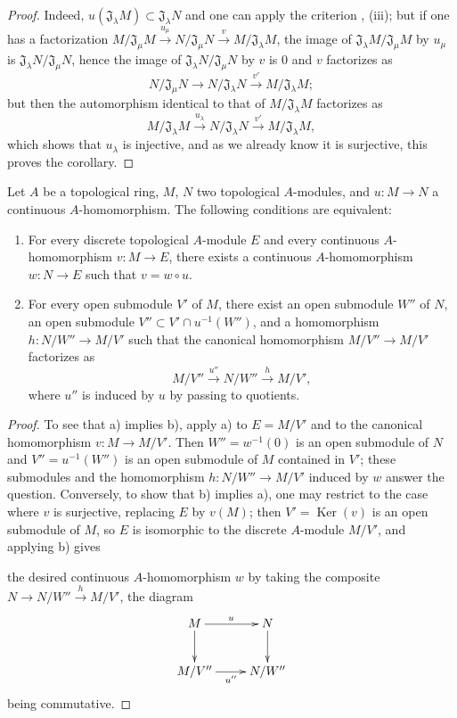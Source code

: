 \begin{proof}
Indeed, $u(\mathfrak{J}_\lambda M)\subset\mathfrak{J}_\lambda N$ and one can apply the criterion , (iii);
but if one has a factorization $M/\mathfrak{J}_\mu M\xrightarrow{u_\mu}N/\mathfrak{J}_\mu N\xrightarrow{v}M/\mathfrak{J}_\lambda M$, the image of $\mathfrak{J}_\lambda M/\mathfrak{J}_\mu M$ by $u_\mu$ is $\mathfrak{J}_\lambda N/\mathfrak{J}_\mu N$, hence the image of $\mathfrak{J}_\lambda N/\mathfrak{J}_\mu N$ by $v$ is $0$ and $v$ factorizes as
\[
  N/\mathfrak{J}_\mu N\to N/\mathfrak{J}_\lambda N\xrightarrow{v'}M/\mathfrak{J}_\lambda M;
\]
but then the automorphism identical to that of $M/\mathfrak{J}_\lambda M$ factorizes as
\[
  M/\mathfrak{J}_\lambda M\xrightarrow{u_\lambda}N/\mathfrak{J}_\lambda N\xrightarrow{v'}M/\mathfrak{J}_\lambda M,
\]
which shows that $u_\lambda$ is injective, and as we already know it is surjective, this proves the corollary.
\end{proof}

\begin{proposition}[19.1.5]
\label{0.19.1.5}
Let $A$ be a topological ring, $M$, $N$ two topological $A$-modules, and $u:M\to N$ a continuous $A$-homomorphism.
The following conditions are equivalent:
\begin{enumerate}
  \item[a)] For every discrete topological $A$-module $E$ and every continuous $A$-homomorphism $v:M\to E$, there exists a continuous $A$-homomorphism $w:N\to E$ such that $v=w\circ u$.
  \item[b)] For every open submodule $V'$ of $M$, there exist an open submodule $W''$ of $N$, an open submodule $V''\subset V'\cap u^{-1}(W'')$, and a homomorphism $h:N/W''\to M/V'$ such that the canonical homomorphism $M/V''\to M/V'$ factorizes as
  \[
    M/V''\xrightarrow{u''}N/W''\xrightarrow{h}M/V',
  \]
  where $u''$ is induced by $u$ by passing to quotients.
\end{enumerate}
\end{proposition}

\begin{proof}
To see that a) implies b), apply a) to $E=M/V'$ and to the canonical homomorphism $v:M\to M/V'$.
Then $W''=w^{-1}(0)$ is an open submodule of $N$ and $V''=u^{-1}(W'')$ is an open submodule of $M$ contained in $V'$;
these submodules and the homomorphism $h:N/W''\to M/V'$ induced by $w$ answer the question.
Conversely, to show that b) implies a), one may restrict to the case where $v$ is surjective, replacing $E$ by $v(M)$;
then $V'=\operatorname{Ker}(v)$ is an open submodule of $M$, so $E$ is isomorphic to the discrete $A$-module $M/V'$, and applying b) gives


the desired continuous $A$-homomorphism $w$ by taking the composite $N\to N/W''\xrightarrow{h}M/V'$, the diagram
\[
  \xymatrix{
    M\ar[r]^u\ar[d] & N\ar[d]\\
    M/V''\ar[r]_{u''} & N/W''
  }
\]
being commutative.
\end{proof}

